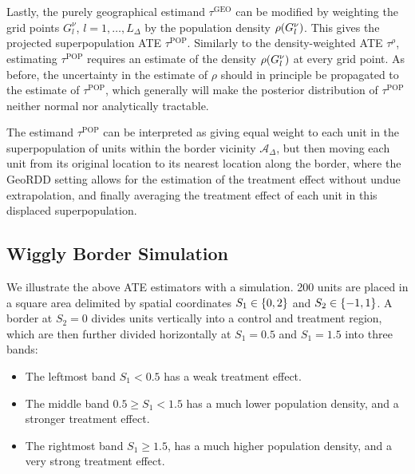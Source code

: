 \documentclass[letter]{article}
\providecommand{\tightlist}{%
      \setlength{\itemsep}{0pt}\setlength{\parskip}{0pt}}
\DeclarePairedDelimiter{\parenthesis}{\lparen}{\rparen}
\DeclarePairedDelimiter{\curlybracket}{\lbrace}{\rbrace}
\newcommand{\del}[1]{\parenthesis*{#1}}
\newcommand{\cbr}[1]{\curlybracket*{#1}}
\newcommand{\area}{\mathcal{A}}
\newcommand{\taurho}{\tau^{\rho}}
\newcommand{\taugeo}{\tau^{\mathrm{GEO}}}
\newcommand{\taupop}{\tau^{\mathrm{POP}}}
\newcommand{\buffer}{\Delta}
\newcommand{\gridres}{\nu}
\newcommand{\grid}{G^\gridres}
\providecommand{\tightlist}{%
  	  \setlength{\itemsep}{0pt}\setlength{\parskip}{0pt}}
\begin{document}
Lastly, the purely geographical estimand \(\taugeo\) can be modified by weighting the grid points \(\grid_l\), \(l=1,\dotsc,L_\buffer\) by the population density \(\rho\del{\grid_l}\).
This gives the projected superpopulation ATE \(\taupop\).
Similarly to the density-weighted ATE \(\taurho\), estimating \(\taupop\) requires an estimate of the density \(\rho\del{\grid_l}\) at every grid point.
As before, the uncertainty in the estimate of \(\rho\) should in principle be propagated to the estimate of \(\taupop\), which generally will make the posterior distribution of \(\taupop\) neither normal nor analytically tractable.

The estimand \(\taupop\) can be interpreted as giving equal weight to each unit in the superpopulation of units within the border vicinity \(\area_\buffer\), but then moving each unit from its original location to its nearest location along the border, where the GeoRDD setting allows for the estimation of the treatment effect without undue extrapolation, and finally averaging the treatment effect of each unit in this displaced superpopulation.
    


    	\hypertarget{wiggly-border-simulation}{%
\subsection{Wiggly Border Simulation}\label{wiggly-border-simulation}}

\label{sec:wiggly_border}
    


    	We illustrate the above ATE estimators with a simulation.
200 units are placed in a square area delimited by spatial coordinates \(S_1 \in \cbr{0,2}\) and \(S_2 \in \cbr{-1, 1}\).
A border at \(S_2=0\) divides units vertically into a control and treatment region,
which are then further divided horizontally at \(S_1=0.5\) and \(S_1=1.5\) into three bands:

\begin{itemize}
\tightlist
\item
  The leftmost band \(S_1 < 0.5\) has a weak treatment effect.
\item
  The middle band \(0.5 \ge S_1 < 1.5\) has a much lower population density, and a stronger treatment effect.
\item
  The rightmost band \(S_1 \ge 1.5\), has a much higher population density, and a very strong treatment effect.
\end{itemize}
\end{document}
